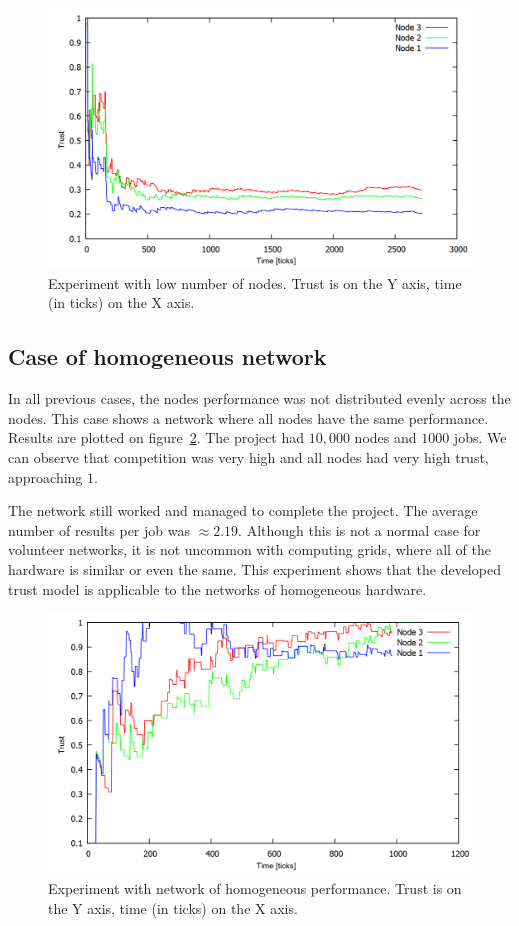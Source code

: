 \begin{figure}
\centering
\includegraphics[width=\textwidth]{diagrams/trust_less_nodes.png}
\caption{Experiment with low number of nodes. Trust is on the Y axis, time (in ticks) on the X axis.}
\label{f:more_jobs}
\end{figure}

\FloatBarrier

\subsection{Case of homogeneous network}

In all previous cases, the nodes performance was not distributed evenly across the nodes. This case shows a network where all nodes have the same performance. Results are plotted on figure~\ref{f:evenly}. The project had $10,000$ nodes and $1000$ jobs. We can observe that competition was very high and all nodes had very high trust, approaching $1$.

The network still worked and managed to complete the project. The average number of results per job was $\approx 2.19$. Although this is not a normal case for volunteer networks, it is not uncommon with computing grids, where all of the hardware is similar or even the same. This experiment shows that the developed trust model is applicable to the networks of homogeneous hardware.

\begin{figure}
\centering
\includegraphics[width=\textwidth]{diagrams/trust_static.png}
\caption{Experiment with network of homogeneous performance. Trust is on the Y axis, time (in ticks) on the X axis.}
\label{f:evenly}
\end{figure}
